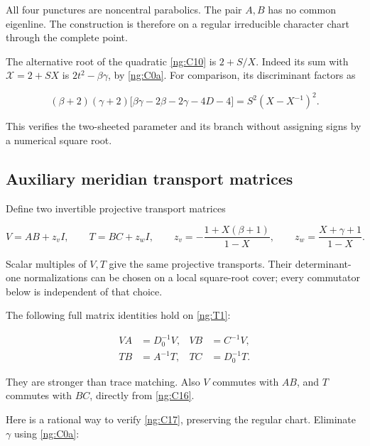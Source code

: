 All four punctures are noncentral parabolics. The pair \(A,B\) has no common eigenline. The construction is therefore on a regular irreducible character chart through the complete point.

The alternative root of the quadratic \eqref{ng:C10} is \(2+S/X\). Indeed its sum with \(\mathcal X=2+SX\) is \(2t^2-\beta\gamma\), by \eqref{ng:C0a}. For comparison, its discriminant factors as

\begin{equation}\label{ng:C15}
(\beta+2)(\gamma+2)
       \bigl[\beta\gamma-2\beta-2\gamma-4D-4\bigr]
           =S^2(X-X^{-1})^2.
\end{equation}

This verifies the two-sheeted parameter and its branch without assigning signs by a numerical square root.

\subsection{Auxiliary meridian transport matrices}\label{ng:auxiliary-transport-matrices-with-the-actual-source-ratios}

Define two invertible projective transport matrices

\begin{equation}\label{ng:C16}
V=AB+z_v I,\qquad T=BC+z_w I,
 \qquad
 z_v=-\frac{1+X(\beta+1)}{1-X},\qquad
 z_w=\frac{X+\gamma+1}{1-X}.
\end{equation}

Scalar multiples of \(V,T\) give the same projective transports. Their determinant-one normalizations can be chosen on a local square-root cover; every commutator below is independent of that choice.

The following full matrix identities hold on \eqref{ng:T1}:

\begin{equation}\label{ng:C17}
\begin{aligned}
 VA&=D_0^{-1}V,& VB&=C^{-1}V,\\
 TB&=A^{-1}T,& TC&=D_0^{-1}T.
 \end{aligned}
\end{equation}

They are stronger than trace matching. Also \(V\) commutes with \(AB\), and \(T\) commutes with \(BC\), directly from \eqref{ng:C16}.

Here is a rational way to verify \eqref{ng:C17}, preserving the regular chart. Eliminate \(\gamma\) using \eqref{ng:C0a}:

